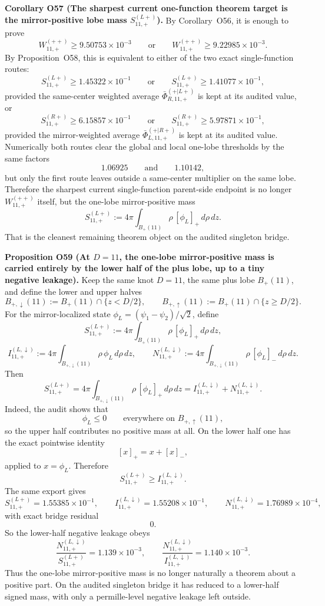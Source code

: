 \documentclass[aps,prd,onecolumn,notitlepage,nofootinbib,superscriptaddress,11pt,floatfix]{revtex4-2}
\begin{document}
\medskip\noindent\textbf{Corollary O57 (The sharpest current one-function theorem target is the mirror-positive lobe mass \(S_{11,+}^{(L+)}\)).}
By Corollary~O56, it is enough to prove
\[
W_{11,+}^{(++)}\ge 9.50753\times10^{-3}
\qquad\text{or}\qquad
W_{11,+}^{(++)}\ge 9.22985\times10^{-3}.
\]
By Proposition~O58, this is equivalent to either of the two exact single-function routes:
\[
S_{11,+}^{(L+)}\ge 1.45322\times10^{-1}
\qquad\text{or}\qquad
S_{11,+}^{(L+)}\ge 1.41077\times10^{-1},
\]
provided the same-center weighted average \(\bar\Phi_{R,11,+}^{(+|L+)}\) is kept at its audited value, or
\[
S_{11,+}^{(R+)}\ge 6.15857\times10^{-1}
\qquad\text{or}\qquad
S_{11,+}^{(R+)}\ge 5.97871\times10^{-1},
\]
provided the mirror-weighted average \(\bar\Phi_{L,11,+}^{(+|R+)}\) is kept at its audited value.  Numerically both routes clear the global and local one-lobe thresholds by the same factors
\[
1.06925
\qquad\text{and}\qquad
1.10142,
\]
but only the first route leaves outside a same-center multiplier on the same lobe.  Therefore the sharpest current single-function parent-side endpoint is no longer \(W_{11,+}^{(++)}\) itself, but the one-lobe mirror-positive mass
\[
S_{11,+}^{(L+)}
:=
4\pi \int_{B_+(11)} \rho\,[\phi_L]_+\,d\rho\,dz.
\]
That is the cleanest remaining theorem object on the audited singleton bridge.

\medskip\noindent\textbf{Proposition O59 (At \(D=11\), the one-lobe mirror-positive mass is carried entirely by the lower half of the plus lobe, up to a tiny negative leakage).}
Keep the same knot \(D=11\), the same plus lobe \(B_+(11)\), and define the lower and upper halves
\[
B_{+,\downarrow}(11):=B_+(11)\cap\{z<D/2\},
\qquad
B_{+,\uparrow}(11):=B_+(11)\cap\{z\ge D/2\}.
\]
For the mirror-localized state \(\phi_L=(\psi_1-\psi_2)/\sqrt2\), define
\[
S_{11,+}^{(L+)}
:=
4\pi \int_{B_+(11)} \rho\,[\phi_L]_+\,d\rho\,dz,
\]
\[
I_{11,+}^{(L,\downarrow)}
:=
4\pi \int_{B_{+,\downarrow}(11)} \rho\,\phi_L\,d\rho\,dz,
\qquad
N_{11,+}^{(L,\downarrow)}
:=
4\pi \int_{B_{+,\downarrow}(11)} \rho\,[\phi_L]_-\,d\rho\,dz.
\]
Then
\[
S_{11,+}^{(L+)}
=
4\pi \int_{B_{+,\downarrow}(11)} \rho\,[\phi_L]_+\,d\rho\,dz
=
I_{11,+}^{(L,\downarrow)}+N_{11,+}^{(L,\downarrow)}.
\]
Indeed, the audit
shows that
\[
\phi_L\le 0
\qquad\text{everywhere on }B_{+,\uparrow}(11),
\]
so the upper half contributes no positive mass at all.  On the lower half one has the exact pointwise identity
\[
[x]_+=x+[x]_-,
\]
applied to \(x=\phi_L\).  Therefore
\[
S_{11,+}^{(L+)}\ge I_{11,+}^{(L,\downarrow)}.
\]
The same export gives
\[
S_{11,+}^{(L+)}=1.55385\times10^{-1},
\qquad
I_{11,+}^{(L,\downarrow)}=1.55208\times10^{-1},
\qquad
N_{11,+}^{(L,\downarrow)}=1.76989\times10^{-4},
\]
with exact bridge residual
\[
0.
\]
So the lower-half negative leakage obeys
\[
\frac{N_{11,+}^{(L,\downarrow)}}{S_{11,+}^{(L+)}}=1.139\times10^{-3},
\qquad
\frac{N_{11,+}^{(L,\downarrow)}}{I_{11,+}^{(L,\downarrow)}}=1.140\times10^{-3}.
\]
Thus the one-lobe mirror-positive mass is no longer naturally a theorem about a positive part.  On the audited singleton bridge it has reduced to a lower-half signed mass, with only a permille-level negative leakage left outside.
\end{document}
